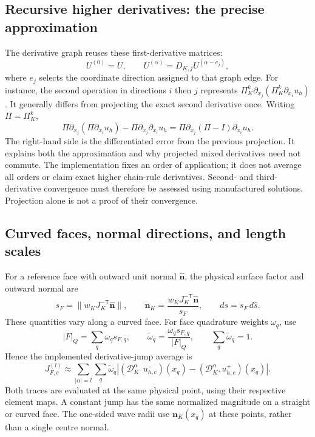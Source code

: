 \subsection{Recursive higher derivatives: the precise approximation}
The derivative graph reuses these first-derivative matrices:
\begin{equation}
 U^{(0)}=U,\qquad U^{(\alpha)}=D_{K,j}U^{(\alpha-e_j)},
 \label{eq:curved-recursion}
\end{equation}
where $e_j$ selects the coordinate direction assigned to that graph edge.
For instance, the second operation in directions $i$ then $j$ represents
$\Pi_K^k\partial_{x_j}(\Pi_K^k\partial_{x_i}u_h)$. It generally differs
from projecting the exact second derivative once. Writing $\Pi=\Pi_K^k$,
\begin{equation}
 \Pi\partial_{x_j}(\Pi\partial_{x_i}u_h)
 -\Pi\partial_{x_j}\partial_{x_i}u_h
 =\Pi\partial_{x_j}(\Pi-I)\partial_{x_i}u_h.
 \label{eq:curved-recursion-defect}
\end{equation}
The right-hand side is the differentiated error from the previous projection.
It explains both the approximation and why projected mixed derivatives need
not commute. The implementation fixes an order of application; it does not
average all orders or claim exact higher chain-rule derivatives. Second- and
third-derivative convergence must therefore be assessed using
manufactured solutions. Projection alone is not a proof of their convergence.

\subsection{Curved faces, normal directions, and length scales}
For a reference face with outward unit normal $\widehat{\boldsymbol n}$, the
physical surface factor and outward normal are
\begin{equation}
 s_F=\|w_KJ_K^{-\mathsf T}\widehat{\boldsymbol n}\|,
 \qquad \boldsymbol n_K=
 \frac{w_KJ_K^{-\mathsf T}\widehat{\boldsymbol n}}{s_F},
 \qquad ds=s_F\,d\widehat s.
 \label{eq:curved-face-metric}
\end{equation}
These quantities vary along a curved face. For face quadrature weights
$\omega_q$, use
\begin{equation}
 |F|_Q=\sum_q\omega_qs_{F,q},\qquad
 \widetilde\omega_q=\frac{\omega_qs_{F,q}}{|F|_Q},\qquad
 \sum_q\widetilde\omega_q=1.
 \label{eq:curved-face-normalization}
\end{equation}
Hence the implemented derivative-jump average is
\begin{equation}
 J_{F,c}^{(l)}\approx\sum_{|\alpha|=l}\sum_q\widetilde\omega_q
 \left| (\mathscr D_{K^-}^{\alpha}u_{h,c}^-)(x_q)
       -(\mathscr D_{K^+}^{\alpha}u_{h,c}^+)(x_q)\right|.
\end{equation}
Both traces are evaluated at the same physical point, using their respective
element maps. A constant jump has the same normalized magnitude on a straight
or curved face. The one-sided wave radii use $\boldsymbol n_K(x_q)$ at these
points, rather than a single centre normal.

